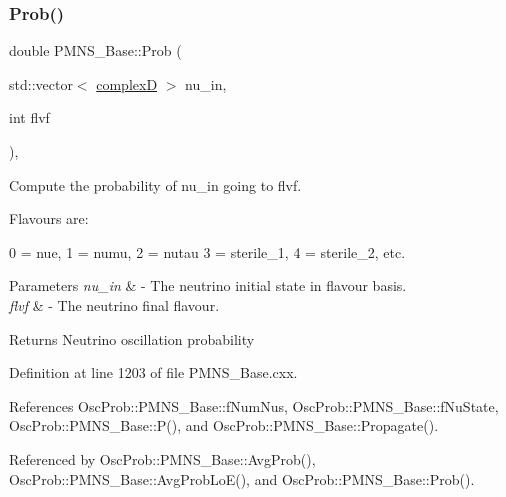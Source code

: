 \subsubsection{\texorpdfstring{Prob()}{Prob()}\hspace{0.1cm}{\footnotesize\ttfamily [1/6]}}
{\footnotesize\ttfamily double P\+M\+N\+S\+\_\+\+Base\+::\+Prob (\begin{DoxyParamCaption}\item[{std\+::vector$<$ \hyperlink{EigenPoint_8h_a67ca8e107e20610c3fff78d5e726ece0}{complexD} $>$}]{nu\+\_\+in,  }\item[{int}]{flvf }\end{DoxyParamCaption})\hspace{0.3cm}{\ttfamily [virtual]}, {\ttfamily [inherited]}}

Compute the probability of nu\+\_\+in going to flvf.

Flavours are\+: 
\begin{DoxyPre}
  0 = nue, 1 = numu, 2 = nutau
  3 = sterile\_1, 4 = sterile\_2, etc.
\end{DoxyPre}
 
\begin{DoxyParams}{Parameters}
{\em nu\+\_\+in} & -\/ The neutrino initial state in flavour basis. \\
\hline
{\em flvf} & -\/ The neutrino final flavour.\\
\hline
\end{DoxyParams}
\begin{DoxyReturn}{Returns}
Neutrino oscillation probability 
\end{DoxyReturn}


Definition at line 1203 of file P\+M\+N\+S\+\_\+\+Base.\+cxx.



References Osc\+Prob\+::\+P\+M\+N\+S\+\_\+\+Base\+::f\+Num\+Nus, Osc\+Prob\+::\+P\+M\+N\+S\+\_\+\+Base\+::f\+Nu\+State, Osc\+Prob\+::\+P\+M\+N\+S\+\_\+\+Base\+::\+P(), and Osc\+Prob\+::\+P\+M\+N\+S\+\_\+\+Base\+::\+Propagate().



Referenced by Osc\+Prob\+::\+P\+M\+N\+S\+\_\+\+Base\+::\+Avg\+Prob(), Osc\+Prob\+::\+P\+M\+N\+S\+\_\+\+Base\+::\+Avg\+Prob\+Lo\+E(), and Osc\+Prob\+::\+P\+M\+N\+S\+\_\+\+Base\+::\+Prob().


